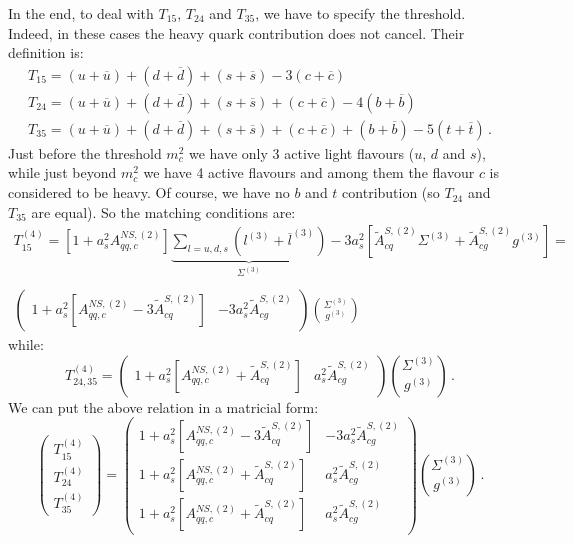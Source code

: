\documentclass[10pt,a4paper]{article}
\begin{document}
In the end, to deal with $T_{15}$, $T_{24}$ and $T_{35}$, we have to
specify the threshold. Indeed, in these cases the heavy quark
contribution does not cancel. Their definition is:
\begin{equation}
\begin{array}{l}
T_{15}=(u+\overline{u})+(d+\overline{d})+(s+\overline{s})-3(c+\overline{c})\\
T_{24}=(u+\overline{u})+(d+\overline{d})+(s+\overline{s})+(c+\overline{c})-4(b+\overline{b})\\
T_{35}=(u+\overline{u})+(d+\overline{d})+(s+\overline{s})+(c+\overline{c})+(b+\overline{b})-5(t+\overline{t})\,.
\end{array}
\end{equation}
Just before the threshold $m_c^2$ we have only 3 active light flavours
($u$, $d$ and $s$), while just beyond $m_c^2$ we have 4 active
flavours and among them the flavour $c$ is considered to be heavy. Of
course, we have no $b$ and $t$ contribution (so $T_{24}$ and $T_{35}$
are equal). So the matching conditions are:
\begin{equation}
\begin{array}{c}
\displaystyle T_{15}^{(4)}=[1+a_s^2A_{qq,c}^{N\!S,(2)}]\underbrace{\sum_{l=u,d,s}(l^{(3)}+\overline{l}^{(3)})}_{\Sigma^{(3)}}-3a_s^2[\tilde{A}^{S,(2)}_{cq}\Sigma^{(3)}+\tilde{A}^{S,(2)}_{cg}g^{(3)}]=\\
\\
\displaystyle \begin{pmatrix} 1+a_s^2[A_{qq,c}^{N\!S,(2)}-3\tilde{A}^{S,(2)}_{cq}] & -3a_s^2\tilde{A}^{S,(2)}_{cg}\end{pmatrix}{\Sigma^{(3)} \choose g^{(3)}}
\end{array}
\end{equation}
while:
\begin{equation}
T_{24,35}^{(4)}=\begin{pmatrix} 1+a_s^2[A_{qq,c}^{N\!S,(2)}+\tilde{A}^{S,(2)}_{cq}] & a_s^2\tilde{A}^{S,(2)}_{cg}\end{pmatrix}{\Sigma^{(3)} \choose g^{(3)}}\,.
\end{equation}
We can put the above relation in a matricial form:
\begin{equation}\label{pippo1}
\begin{pmatrix} T_{15}^{(4)} \\ T_{24}^{(4)} \\ T_{35}^{(4)} \end{pmatrix} = \begin{pmatrix}  1+a_s^2[A_{qq,c}^{N\!S,(2)}-3\tilde{A}^{S,(2)}_{cq}] & -3a_s^2\tilde{A}^{S,(2)}_{cg}\\  
1+a_s^2[A_{qq,c}^{N\!S,(2)}+\tilde{A}^{S,(2)}_{cq}] & a_s^2\tilde{A}^{S,(2)}_{cg} \\
1+a_s^2[A_{qq,c}^{N\!S,(2)}+\tilde{A}^{S,(2)}_{cq}] & a_s^2\tilde{A}^{S,(2)}_{cg} \end{pmatrix}{\Sigma^{(3)} \choose g^{(3)}}\,.
\end{equation}
\end{document}
